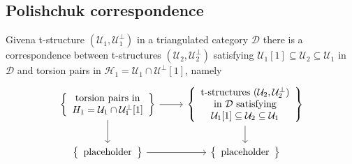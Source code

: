 \subsection{Polishchuk correspondence}

Givena t-structure $(\mathcal{U}_1,\mathcal{U}_1^\perp)$ in a triangulated category $\mathcal{D}$ there is
a correspondence between t-structures $(\mathcal{U}_2,\mathcal{U}_2^\perp)$ satisfying $\mathcal{U}_1[1]\subseteq \mathcal{U}_2\subseteq\mathcal{U}_1$
in $\mathcal{D}$ and torsion pairs in $\mathcal{H}_1=\mathcal{U}_1\cap\mathcal{U}^\perp[1]$, namely
\begin{equation*}
  \begin{tikzcd}
    \left\{
    \begin{array}{c}
      \text{torsion pairs in} \\
      H_1=\mathcal{U}_1\cap \mathcal{U}_1^\perp[1]
    \end{array}
    \right\}
    \arrow{r}\arrow{d}
      &
      \left\{
        \begin{array}{c}
          \text{t-structures }
          (\mathcal{U}_2,\mathcal{U}_2^\perp) \\
          \text{ in } \mathcal{D}
          \text{ satisfying } \\ \mathcal{U}_1[1]\subseteq \mathcal{U}_2\subseteq\mathcal{U}_1
        \end{array}
      \right\}
      \arrow{d} \\
    \left\{
    \begin{array}{c}
      \text{placeholder}
    \end{array}
    \right\}
    \arrow{r}
      &
      \left\{
      \begin{array}{c}
        \text{placeholder}
      \end{array}
      \right\}
  \end{tikzcd}
\end{equation*}
